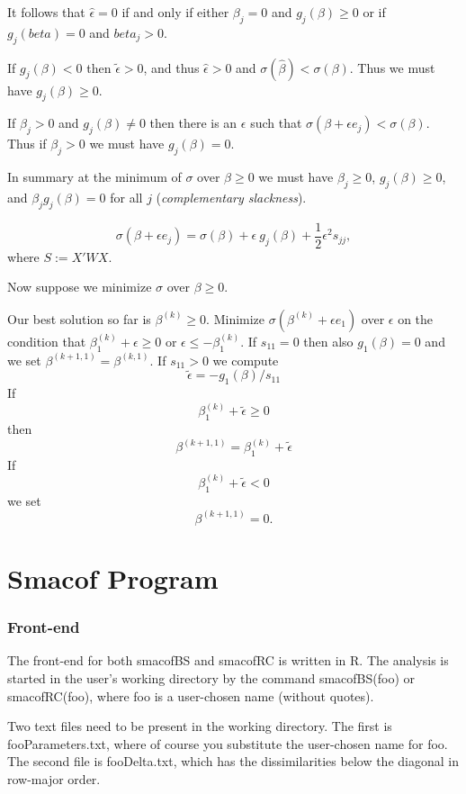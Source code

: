\documentclass[
  12pt,
]{article}
\begin{document}
It follows that \(\hat\epsilon=0\) if and only if either \(\beta_j=0\) and
\(g_j(\beta)\geq 0\) or if \(g_j(beta)=0\) and \(beta_j>0\).

If \(g_j(\beta)<0\) then \(\tilde\epsilon>0\), and thus \(\hat\epsilon>0\) and
\(\sigma(\hat\beta)<\sigma(\beta)\). Thus we must have \(g_j(\beta)\geq 0\).

If \(\beta_j>0\) and \(g_j(\beta)\not=0\) then there is an \(\epsilon\) such
that \(\sigma(\beta+\epsilon e_j)<\sigma(\beta)\). Thus if \(\beta_j>0\) we
must have \(g_j(\beta)=0\).

In summary at the minimum of \(\sigma\) over \(\beta\geq 0\) we must have
\(\beta_j\geq 0\), \(g_j(\beta)\geq 0\), and \(\beta_jg_j(\beta)=0\) for all
\(j\) (\emph{complementary slackness}).

\[
\sigma(\beta+\epsilon e_j)=\sigma(\beta)+\epsilon\ g_j(\beta)+\frac12\epsilon^2s_{jj},
\] where \(S:=X'WX\).

Now suppose we minimize \(\sigma\) over \(\beta\geq 0\).

Our best solution so far is \(\beta^{(k)}\geq 0\). Minimize
\(\sigma(\beta^{(k)}+\epsilon e_1)\) over \(\epsilon\) on the condition that
\(\beta^{(k)}_1+\epsilon\geq 0\) or \(\epsilon\leq-\beta^{(k)}_1\). If
\(s_{11}=0\) then also \(g_1(\beta)=0\) and we set
\(\beta^{(k+1,1)}=\beta^{(k,1)}\). If \(s_{11}>0\) we compute \[
\tilde\epsilon=-g_1(\beta)/s_{11}
\] If \[
\beta^{(k)}_1+\tilde\epsilon\geq 0
\] then \[
\beta^{(k+1,1)}=\beta^{(k)}_1+\tilde\epsilon
\] If \[
\beta^{(k)}_1+\tilde\epsilon<0
\] we set \[
\beta^{(k+1,1)}=0.
\]

\section{Smacof Program}\label{smacof-program}

\subsubsection{Front-end}\label{front-end}

The front-end for both smacofBS and smacofRC is written in R. The
analysis is started in the user's working directory by the command
smacofBS(foo) or smacofRC(foo), where foo is a user-chosen name (without
quotes).

Two text files need to be present in the working directory. The first is
fooParameters.txt, where of course you substitute the user-chosen name
for foo. The second file is fooDelta.txt, which has the dissimilarities
below the diagonal in row-major order.
\end{document}
